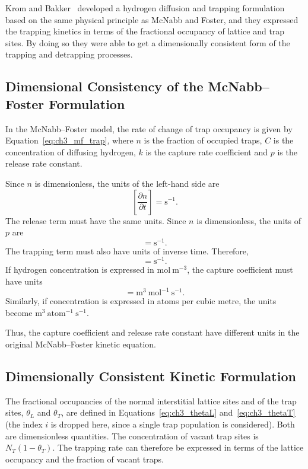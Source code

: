 \documentclass[a4paper,12pt,oneside]{report}
\begin{document}
Krom and Bakker~\cite{Krom2000} developed a hydrogen diffusion and trapping formulation based on the same physical principle as McNabb and Foster, and they expressed the trapping kinetics in terms of the fractional occupancy of lattice and trap sites. By doing so they were able to get a dimensionally consistent form of the trapping and detrapping processes.

\subsection{Dimensional Consistency of the McNabb--Foster Formulation}

In the McNabb--Foster model, the rate of change of trap occupancy is given by Equation~\eqref{eq:ch3_mf_trap}, where $n$ is the fraction of occupied traps, $C$ is the concentration of diffusing hydrogen, $k$ is the capture rate coefficient and $p$ is the release rate constant.

Since $n$ is dimensionless, the units of the left-hand side are
\begin{equation}
\left[\frac{\partial n}{\partial t}\right] = \mathrm{s}^{-1}.
\label{eq:ch3_n_units}
\end{equation}
The release term must have the same units. Since $n$ is dimensionless, the units of $p$ are
\begin{equation}
[p] = \mathrm{s}^{-1}.
\label{eq:ch3_p_units}
\end{equation}
The trapping term must also have units of inverse time. Therefore,
\begin{equation}
[kC] = \mathrm{s}^{-1}.
\label{eq:ch3_kC_units}
\end{equation}
If hydrogen concentration is expressed in $\mathrm{mol~m^{-3}}$, the capture coefficient must have units
\begin{equation}
[k] = \mathrm{m^3~mol^{-1}~s^{-1}}.
\label{eq:ch3_k_units}
\end{equation}
Similarly, if concentration is expressed in atoms per cubic metre, the units become $\mathrm{m^3~atom^{-1}~s^{-1}}$.

Thus, the capture coefficient and release rate constant have different units in the original McNabb--Foster kinetic equation.

\subsection{Dimensionally Consistent Kinetic Formulation}

The fractional occupancies of the normal interstitial lattice sites and of the trap sites, $\theta_L$ and $\theta_T$, are defined in Equations~\eqref{eq:ch3_thetaL} and~\eqref{eq:ch3_thetaT} (the index $i$ is dropped here, since a single trap population is considered). Both are dimensionless quantities. The concentration of vacant trap sites is $N_T(1-\theta_T)$. The trapping rate can therefore be expressed in terms of the lattice occupancy and the fraction of vacant traps.
\end{document}
